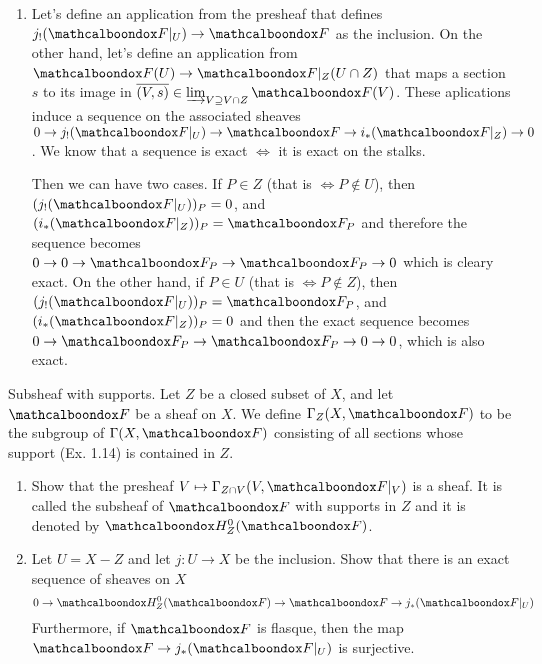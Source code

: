 \begin{sol}
\begin{enumerate}[label=\alph*)]
		\item Let's define an application from the presheaf that defines $j_{!}(\sF|_{U}) \to \sF$ as the inclusion. On the other hand, let's define an application from $\sF(U) \to \sF|_Z (U \cap Z)$ that maps a section $s$ to its image in $\overline{(V,s)} \in \varinjlim_{V \supseteq V \cap Z} \sF(V)$.  These aplications induce a sequence on the associated sheaves $0 \to j_{!}(\sF|_{U}) \to \sF \to i_{*}(\sF|_{Z}) \to 0$. We know that a sequence is exact $\iff$ it is exact on the stalks. 

		Then we can have two cases. If $P \in Z$ (that is $\iff P \notin U$), then $(j_{!}(\sF|_U))_P = 0$, and $(i_{*}(\sF|_Z))_P = \sF_P$ and therefore the sequence becomes $0 \to 0 \to \sF_P \to \sF_P \to 0$ which is cleary exact. On the other hand, if $P \in U$ (that is $\iff P \notin Z$), then $(j_{!}(\sF|_U))_P = \sF_P$, and $(i_{*}(\sF|_Z))_P = 0$ and then the exact sequence becomes $0 \to \sF_P \to \sF_P \to 0 \to 0$, which is also exact.

	\end{enumerate}

\end{sol}

\begin{ex}
	Subsheaf with supports. Let $Z$ be a closed subset of $X$, and let $\sF$ be a sheaf on $X$. We define $\Gamma_Z(X, \sF)$ to be the subgroup of $\Gamma(X,\sF)$ consisting of all sections whose support (Ex. 1.14) is contained in $Z$.
	\begin{enumerate}[label=\alph*)]
		\item Show that the presheaf $V \mapsto \Gamma_{Z \cap V}(V, \sF|_V)$ is a sheaf. It is called the subsheaf of $\sF$ with supports in $Z$ and it is denoted by $\sH^{0}_Z(\sF)$.

		\item Let $U = X-Z$ and let $j: U \to X$ be the inclusion. Show that there is an exact sequence of sheaves on $X$
		\[
		 0 \to \sH^{0}_Z(\sF) \to \sF \to j_{*}(\sF|_U)
		\]
		Furthermore, if $\sF$ is flasque, then the map $\sF \to j_{*}(\sF|_U)$ is surjective.
	\end{enumerate}
\end{ex}

